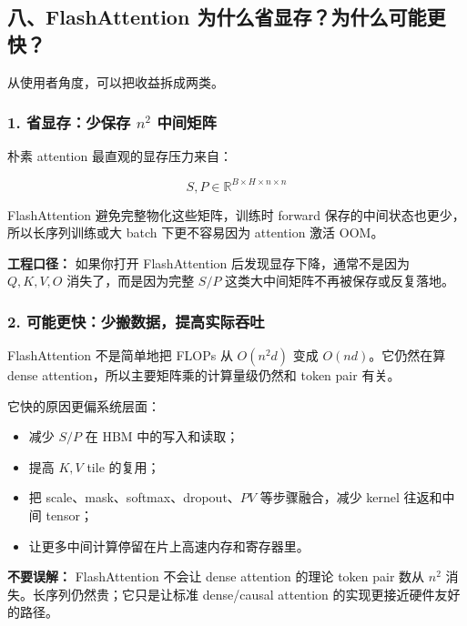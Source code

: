 \subsection{八、FlashAttention 为什么省显存？为什么可能更快？}

从使用者角度，可以把收益拆成两类。

\subsubsection*{1. 省显存：少保存 $n^2$ 中间矩阵}

朴素 attention 最直观的显存压力来自：

\[
S,P \in \mathbb{R}^{B\times H\times n\times n}
\]

FlashAttention 避免完整物化这些矩阵，训练时 forward 保存的中间状态也更少，所以长序列训练或大 batch 下更不容易因为 attention 激活 OOM。

\begin{intubox}
\textbf{工程口径：} 如果你打开 FlashAttention 后发现显存下降，通常不是因为 $Q,K,V,O$ 消失了，而是因为完整 $S/P$ 这类大中间矩阵不再被保存或反复落地。
\end{intubox}

\subsubsection*{2. 可能更快：少搬数据，提高实际吞吐}

FlashAttention 不是简单地把 FLOPs 从 $O(n^2d)$ 变成 $O(n d)$。它仍然在算 dense attention，所以主要矩阵乘的计算量级仍然和 token pair 有关。

它快的原因更偏系统层面：

\begin{itemize}[leftmargin=1.5em]
  \item 减少 $S/P$ 在 HBM 中的写入和读取；
  \item 提高 $K,V$ tile 的复用；
  \item 把 scale、mask、softmax、dropout、$PV$ 等步骤融合，减少 kernel 往返和中间 tensor；
  \item 让更多中间计算停留在片上高速内存和寄存器里。
\end{itemize}

\begin{warnbox}
\textbf{不要误解：} FlashAttention 不会让 dense attention 的理论 token pair 数从 $n^2$ 消失。长序列仍然贵；它只是让标准 dense/causal attention 的实现更接近硬件友好的路径。
\end{warnbox}

